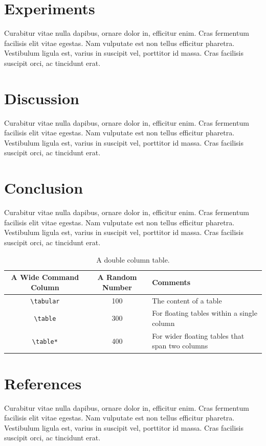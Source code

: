 \documentclass[sigconf, nonacm]{acmart}
\begin{document}
\section{Experiments}
Curabitur vitae nulla dapibus, ornare dolor in, efficitur enim. Cras fermentum facilisis elit vitae egestas. Nam vulputate est non tellus efficitur pharetra. Vestibulum ligula est, varius in suscipit vel, porttitor id massa. Cras facilisis suscipit orci, ac tincidunt erat.

\section{Discussion}

Curabitur vitae nulla dapibus, ornare dolor in, efficitur enim. Cras fermentum facilisis elit vitae egestas. Nam vulputate est non tellus efficitur pharetra. Vestibulum ligula est, varius in suscipit vel, porttitor id massa. Cras facilisis suscipit orci, ac tincidunt erat.

\section{Conclusion}

Curabitur vitae nulla dapibus, ornare dolor in, efficitur enim. Cras fermentum facilisis elit vitae egestas. Nam vulputate est non tellus efficitur pharetra. Vestibulum ligula est, varius in suscipit vel, porttitor id massa. Cras facilisis suscipit orci, ac tincidunt erat.

\begin{table}[t]
  \caption{A double column table.}
  \label{tab:commands}
  \begin{tabular}{ccl}
    \toprule
    A Wide Command Column & A Random Number & Comments\\
    \midrule
    \verb|\tabular| & 100& The content of a table \\
    \verb|\table|  & 300 & For floating tables within a single column\\
    \verb|\table*| & 400 & For wider floating tables that span two columns\\
    \bottomrule
  \end{tabular}
\end{table}

\section{References}

Curabitur vitae nulla dapibus, ornare dolor in, efficitur enim. Cras fermentum facilisis elit vitae egestas. Nam vulputate est non tellus efficitur pharetra. Vestibulum ligula est, varius in suscipit vel, porttitor id massa. Cras facilisis suscipit orci, ac tincidunt erat.
\end{document}
